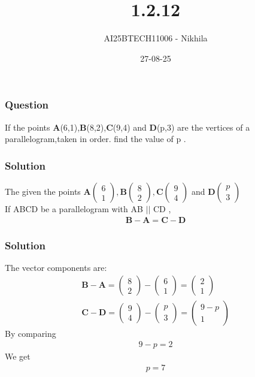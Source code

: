\documentclass{beamer}
\title{1.2.12}
\author{AI25BTECH11006 - Nikhila}
\date{27-08-25}
\begin{document}
\frame{\titlepage}

\begin{frame}
\frametitle{Question}
If the points \textbf{A}(6,1),\textbf{B}(8,2),\textbf{C}(9,4) and \textbf{D}(p,3) are the vertices of a parallelogram,taken in order. find the value of p .
\\\end{frame}




\begin{frame}
\frametitle{Solution}
The given the points $\textbf{A}\begin{pmatrix}6 \\ 1 \end{pmatrix} , \textbf{B}\begin{pmatrix}8 \\ 2\end{pmatrix} , \textbf{C}\begin{pmatrix}9 \\ 4\end{pmatrix}$ and $\textbf{D}\begin{pmatrix}p \\ 3\end{pmatrix}$\\
\vspace{1em}
 If ABCD be a parallelogram with AB $||$ CD ,
\begin{align*}
\textbf{$\textbf{B}-\textbf{A} = \textbf{C}-\textbf{D}$}
\end{align*}
 \end{frame}



\begin{frame}
\frametitle{Solution}
The vector components are:
\begin{align}
   \textbf{B} - \textbf{A} =\begin{pmatrix}8 \\ 2\end{pmatrix} - \begin{pmatrix}6 \\ 1\end{pmatrix} = \begin{pmatrix}2 \\ 1\end{pmatrix}\\
   \textbf{C}- \textbf{D}=\begin{pmatrix}9 \\ 4\end{pmatrix} - \begin{pmatrix}p \\ 3\end{pmatrix} = \begin{pmatrix}9-p \\ 1\end{pmatrix}
\end{align}
By comparing 
\begin{align}
    9-p = 2
\end{align}
We get 
\begin{align}
    p = 7
\end{align}

\end{frame}
\end{document}
